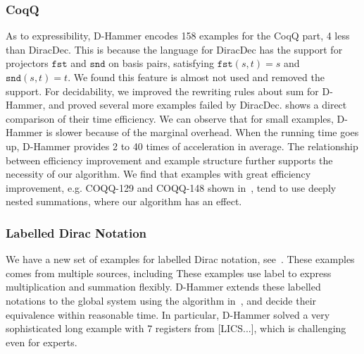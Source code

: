 \subsubsection{CoqQ}
As to expressibility, D-Hammer encodes 158 examples for the CoqQ part, 4 less than DiracDec. This is because the language for DiracDec has the support for projectors $\texttt{fst}$ and $\texttt{snd}$ on basis pairs, satisfying $\texttt{fst} (s, t) = s$ and $\texttt{snd} (s, t) = t$. We found this feature is almost not used and removed the support. For decidability, we improved the rewriting rules about sum for D-Hammer, and proved several more examples failed by DiracDec. 
 shows a direct comparison of their time efficiency.
We can observe that for small examples, D-Hammer is slower because of the marginal overhead. 
When the running time goes up, D-Hammer provides 2 to 40 times of acceleration in average.
The relationship between efficiency improvement and example structure further supports the necessity of our algorithm. 
We find that examples with great efficiency improvement, e.g. COQQ-129 and COQQ-148 shown in~, tend to use deeply nested summations, where our algorithm has an effect.



\subsubsection{Labelled Dirac Notation}
We have a new set of examples for labelled Dirac notation, see~.
These examples comes from multiple sources, including 
These examples use label to express multiplication and summation flexibly. D-Hammer extends these labelled notations to the global system using the algorithm in~, and decide their equivalence within reasonable time. In particular, D-Hammer solved a very sophisticated long example with 7 registers from [LICS...], which is challenging even for experts.